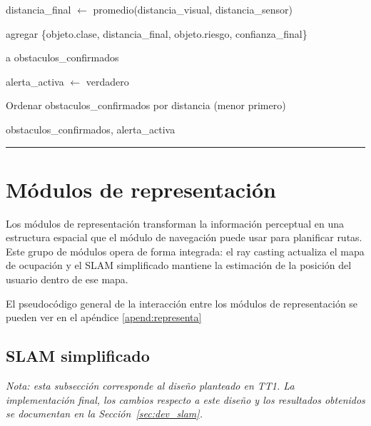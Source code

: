 \begin{algorithmic}[1]
        \State distancia\_final $\gets$
        promedio(distancia\_visual, distancia\_sensor)

        \State agregar \{objeto.clase, distancia\_final,
        \Statex \hspace{1.3cm} objeto.riesgo, confianza\_final\}

        \Statex \hspace{1.3cm} a obstaculos\_confirmados

        \Statex


            \State alerta\_activa $\gets$ verdadero

        \EndIf

    \EndIf

\EndFor

\Statex
\State Ordenar obstaculos\_confirmados por distancia (menor primero)

\Statex
\State \Return obstaculos\_confirmados, alerta\_activa

\end{algorithmic}
\vspace{-0.9cm}
\rule{\textwidth}{0.4pt}
\section{Módulos de representación}

Los módulos de representación transforman la información perceptual en una estructura
espacial que el módulo de navegación puede usar para planificar rutas. Este grupo de
módulos opera de forma integrada: el ray casting actualiza el mapa de ocupación y el
SLAM simplificado mantiene la estimación de la posición del usuario dentro de ese mapa.

El pseudocódigo general de la interacción entre los módulos de representación se pueden ver en el apéndice \ref{apend:representa}

\subsection{SLAM simplificado}

\textit{Nota: esta subsección corresponde al diseño planteado en TT1. La
implementación final, los cambios respecto a este diseño y los resultados obtenidos
se documentan en la Sección~\ref{sec:dev_slam}.}

